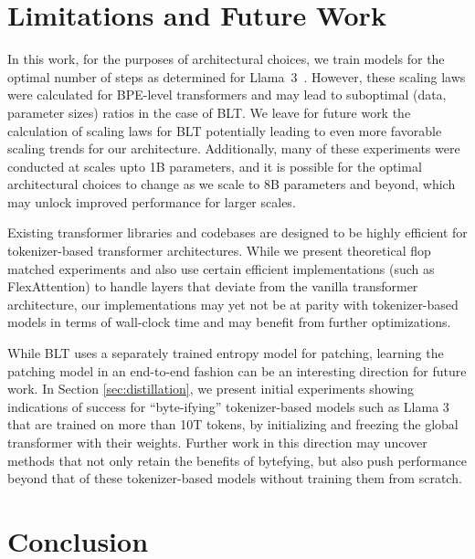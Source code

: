 \section{Limitations and Future Work}

In this work, for the purposes of architectural choices, we train models for the optimal number of steps as determined for Llama~3~\citep{dubey2024llama}. However, these scaling laws were calculated for BPE-level transformers and may lead to suboptimal (data, parameter sizes) ratios in the case of {\textsc BLT}. We leave for future work the calculation of scaling laws for {\textsc BLT} potentially leading to even more favorable scaling trends for our architecture. Additionally, many of these experiments were conducted at scales upto 1B parameters, and it is possible for the optimal architectural choices to change as we scale to 8B parameters and beyond, which may unlock improved performance for larger scales. 

Existing transformer libraries and codebases are designed to be highly efficient for tokenizer-based transformer architectures. While we present theoretical flop matched experiments and also use certain efficient implementations (such as FlexAttention) to handle layers that deviate from the vanilla transformer architecture, our implementations may yet not be at parity with tokenizer-based models in terms of wall-clock time and may benefit from further optimizations. 

While {\textsc BLT} uses a separately trained entropy model for patching, learning the patching model in an end-to-end fashion can be an interesting direction for future work. In Section \ref{sec:distillation}, we present initial experiments showing indications of success for ``byte-ifying'' tokenizer-based models such as Llama 3 that are trained on more than 10T tokens, by initializing and freezing the global transformer with their weights. Further work in this direction may uncover methods that not only retain the benefits of bytefying, but also push performance beyond that of these tokenizer-based models without training them from scratch. 

\section{Conclusion}
\label{section:conclusion}

